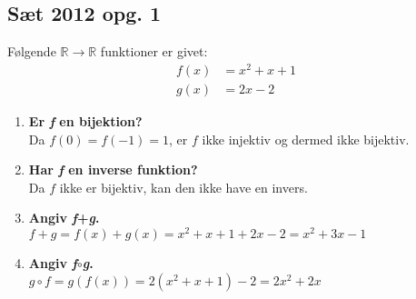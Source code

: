 \documentclass[12pt, a4paper]{article}
\begin{document}
\subsection{Sæt 2012 opg. 1}
Følgende $\mathbb{R} \rightarrow \mathbb{R}$ funktioner er givet:
\begin{align*}
	f(x) & = x^2+x+1 \\
	g(x) & = 2x -2
\end{align*}
\begin{enumerate}[label=\alph*)]
	\item {
		\textbf{Er \textit{f} en bijektion?} \\
		Da $f(0)=f(-1)=1$, er $f$ ikke injektiv og dermed ikke bijektiv.
	}
	\item {
		\textbf{Har \textit{f} en inverse funktion?} \\
		Da $f$ ikke er bijektiv, kan den ikke have en invers.
	}
	\item {
		\textbf{Angiv \textit{f}+\textit{g}.} \\
		$f+g=f(x)+g(x)=x^2+x+1+2x-2=x^2+3x-1$
	}
	\item {
		\textbf{Angiv \textit{f}$\circ$\textit{g}.} \\
		$g\circ f=g(f(x))=2(x^2+x+1)-2=2x^2+2x$
	}
\end{enumerate}
\end{document}
